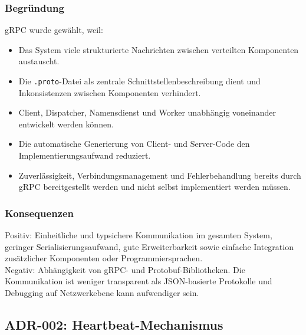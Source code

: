 \subsubsection*{Begründung}

gRPC wurde gewählt, weil:

\begin{itemize}
	\item Das System viele strukturierte Nachrichten zwischen verteilten Komponenten austauscht.
	\item Die \texttt{.proto}-Datei als zentrale Schnittstellenbeschreibung dient und Inkonsistenzen zwischen Komponenten verhindert.
	\item Client, Dispatcher, Namensdienst und Worker unabhängig voneinander entwickelt werden können.
	\item Die automatische Generierung von Client- und Server-Code den Implementierungsaufwand reduziert.
	\item Zuverlässigkeit, Verbindungsmanagement und Fehlerbehandlung bereits durch gRPC bereitgestellt werden und nicht selbst implementiert werden müssen.
\end{itemize}

\subsubsection*{Konsequenzen}

Positiv: Einheitliche und typsichere Kommunikation im gesamten System,
geringer Serialisierungsaufwand, gute Erweiterbarkeit sowie einfache
Integration zusätzlicher Komponenten oder Programmiersprachen.
\\
Negativ: Abhängigkeit von gRPC- und Protobuf-Bibliotheken.
Die Kommunikation ist weniger transparent als JSON-basierte Protokolle
und Debugging auf Netzwerkebene kann aufwendiger sein.

\subsection{ADR-002: Heartbeat-Mechanismus}

